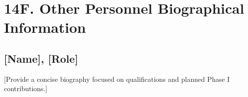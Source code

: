 \documentclass[11pt,letterpaper]{article}
\begin{document}
\section*{14F. Other Personnel Biographical Information}


\subsection*{[Name], [Role]}
[Provide a concise biography focused on qualifications and planned Phase I
contributions.]
\end{document}
